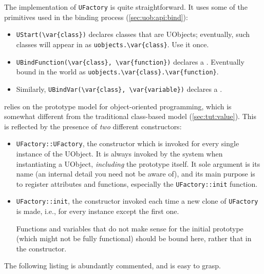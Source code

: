 

The implementation of \lstinline|UFactory| is quite straightforward.
It uses some of the primitives used in the binding process
(\autoref{sec:uob:api:bind}):
\begin{itemize}
\item \lstinline|UStart(\var{class})| declares classes that are
  UObjects; eventually, such classes will appear in \us as
  \lstinline|uobjects.\var{class}|.  Use it once.

\item \lstinline|UBindFunction(\var{class}, \var{function})| declares
  a .  Eventually bound in the \us world as
  \lstinline|uobjects.\var{class}.\var{function}|.

\item Similarly, \lstinline|UBindVar(\var{class}, \var{variable})|
  declares a .
\end{itemize}

\urbi relies on the prototype model for object-oriented programming,
which is somewhat different from the traditional \Cxx class-based
model (\autoref{sec:tut:value}).  This is reflected by the presence of 
\emph{two} different constructors:
\begin{itemize}
\item \lstinline|UFactory::UFactory|, the \Cxx constructor which is
  invoked for every single instance of the UObject.  It is always
  invoked by the \urbi system when instantiating a UObject,
  \emph{including} the prototype itself.  It sole argument is its name
  (an internal detail you need not be aware of), and its main purpose
  is to register attributes and functions, especially the
  \lstinline|UFactory::init| function.

\item \lstinline|UFactory::init|, the \urbi constructor invoked each
  time a new clone of \lstinline|UFactory| is made, i.e., for every
  instance except the first one.
  
  Functions and variables that do not make sense for the initial
  prototype (which might not be fully functional) should be bound
  here, rather that in the \Cxx constructor.
\end{itemize}

The following listing is abundantly commented, and is easy to grasp.



